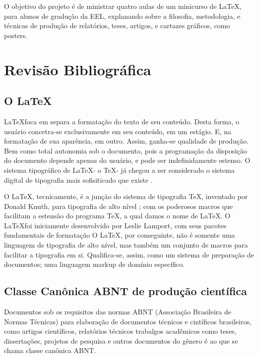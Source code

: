\documentclass[
	12pt,				%
	openright,			%
	oneside,			%
	a4paper,			%
        brazil,				%
	]{abntex2}
\begin{document}
O objetivo do projeto é de ministrar quatro aulas de um minicurso de
\LaTeX, para alunos de gradução da EEL, explanando sobre a filosofia,
metodologia, e técnicas de produção de relatórios, teses, artigos, e
cartazes gráficos, como posters.

\chapter{Revisão Bibliográfica}

\section{O \LaTeX}

\LaTeX foca em separa a formatação do texto de seu conteúdo. Desta
forma, o usuário concetra-se exclusivamente em seu conteúdo, em um
estágio. E, na formatação de sua aparência, em outro. Assim, ganha-se
qualidade de produção. Bem como total autonomia sob o documento, pois
a programação da disposição do documento depende apenas do usuário, e
pode ser indefinidamente estenso. O sistema tipográfico de \LaTeX - o
\TeX - já chegou a ser considerado o sistema digital de
tipografia mais sofisiticado que existe \cite{haralambous2007}.

O \LaTeX, tecnicamente, é a junção do sistema de tipografia \TeX,
inventado por Donald Knuth, para tipografia de alto nível
\cite{knuth1986}; com os poderosos macros que facilitam a estensão do programa \TeX, a qual damos o nome de
\LaTeX. O \LaTeX foi iniciamente desenvolvido por Leslie Lamport, com
seus pacotes fundamentais de formatação \cite{lamport1994} O \LaTeX,
por conseguinte, não é somente uma linguagem de tipografia de alto
nível, mas também um conjunto de macros para facilitar a tipografia em
si. Qualifica-se, assim, como um sistema de preparação de documentos;
uma linguagem markup de domínio específico.

\section{Classe Canônica ABNT de produção científica}

Documentos sob os requisitos das normas ABNT (Associação Brasileira de Normas
Técnicas) para elaboração de documentos técnicos e cintíficos
brasileiros, como artigos científicos, relatórios técnicos trabalgos
acadêmicos como teses, dissertações, projetos de pesquisa e outros
documentos do gênero \cite{abntex2012} é ao que se chama classe
canônica ABNT.
\end{document}

